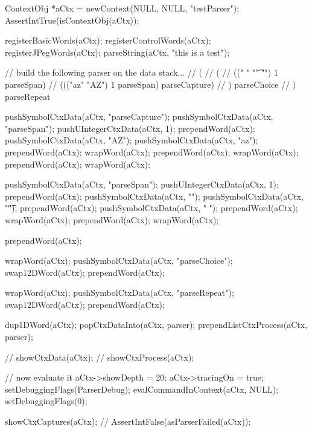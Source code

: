 \startCTest
  ContextObj *aCtx = newContext(NULL, NULL, "testParser");
  AssertIntTrue(isContextObj(aCtx));
  
  registerBasicWords(aCtx);
  registerControlWords(aCtx);
  registerJPegWords(aCtx);
  parseString(aCtx, "this is a test");

  // build the following parser on the data stack...
  // ( 
  //   (
  //     ((" " "\t" "\n") 1 parseSpan)
  //     ((("az" "AZ") 1 parseSpan) parseCapture)
  //   ) parseChoice
  // ) parseRepeat

  pushSymbolCtxData(aCtx, "parseCapture");
  pushSymbolCtxData(aCtx, "parseSpan");
  pushUIntegerCtxData(aCtx, 1);
  prependWord(aCtx);
  pushSymbolCtxData(aCtx, "AZ");
  pushSymbolCtxData(aCtx, "az");
  prependWord(aCtx);
  wrapWord(aCtx);
  prependWord(aCtx);
  wrapWord(aCtx);
  prependWord(aCtx);
  wrapWord(aCtx);
  
  pushSymbolCtxData(aCtx, "parseSpan");
  pushUIntegerCtxData(aCtx, 1);
  prependWord(aCtx);
  pushSymbolCtxData(aCtx, "\n");
  pushSymbolCtxData(aCtx, "\t");
  prependWord(aCtx);
  pushSymbolCtxData(aCtx, " ");
  prependWord(aCtx);
  wrapWord(aCtx);
  prependWord(aCtx);
  wrapWord(aCtx);
  
  prependWord(aCtx);
  
  wrapWord(aCtx);
  pushSymbolCtxData(aCtx, "parseChoice");
  swap12DWord(aCtx);
  prependWord(aCtx);
  
  wrapWord(aCtx);
  pushSymbolCtxData(aCtx, "parseRepeat");
  swap12DWord(aCtx);
  prependWord(aCtx);
  
  dup1DWord(aCtx);
  popCtxDataInto(aCtx, parser);
  prependListCtxProcess(aCtx, parser);
  
//  showCtxData(aCtx);
//  showCtxProcess(aCtx);
  
  // now evaluate it
  aCtx->showDepth = 20;
  aCtx->tracingOn = true;
  setDebuggingFlags(ParserDebug);
  evalCommandInContext(aCtx, NULL);
  setDebuggingFlags(0);
  
  showCtxCaptures(aCtx);
//  AssertIntFalse(asParserFailed(aCtx));
\stopCTest
\stopTestCase
\stopTestSuite